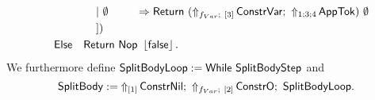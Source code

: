\begin{definition}
\begin{alignat*}{1}
    & \quad \phantom{\MS{Then}~(\lambda}~|~ \phalign{\Some{\MS{LAM}}}{\None} \Rightarrow \Return{(\LiftBoth{\MS{ConstrVar}}{f_{Var}}{\Vector{3}} \Seq \LiftTapes{\MS{AppTok}}{1;3;4})}{\None} \\
    & \quad \phantom{\MS{Then}~(\lambda}~]) \\
    & \quad \MS{Else}~~~ \Return{\Nop}{\Some\false}.
  \end{alignat*}
  We furthermore define $\MS{SplitBodyLoop} := \While~\MS{SplitBodyStep}$ and
  \[
    \MS{SplitBody} := \LiftTapes{\MS{ConstrNil}}{\Vector{1}} \Seq \LiftBoth{\MS{ConstrO}}{f_{Var}}{\Vector{2}} \Seq \MS{SplitBodyLoop}.
  \]
\end{definition}

